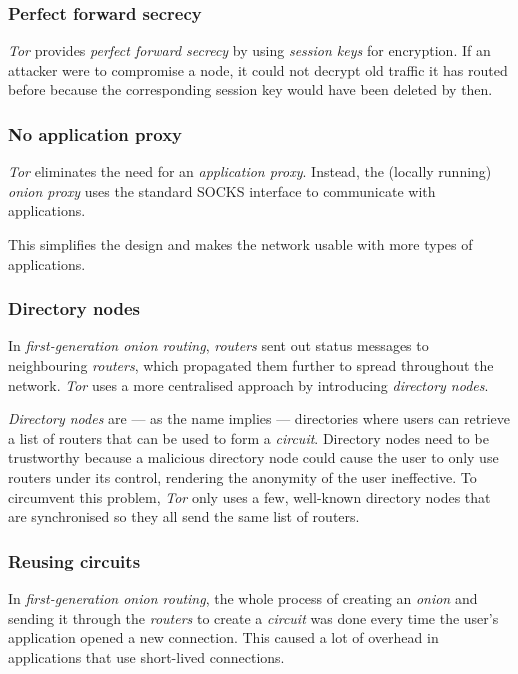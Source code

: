 \documentclass{sig-alternate}
\begin{document}
\subsubsection{Perfect forward secrecy}
\emph{Tor} provides \emph{perfect forward secrecy} by using \emph{session keys} for encryption.
If an attacker were to compromise a node, it could not decrypt old traffic it has routed before
because the corresponding session key would have been deleted by then.

\subsubsection{No application proxy}
\emph{Tor} eliminates the need for an \emph{application proxy}. Instead, the (locally running) 
\emph{onion proxy} uses the standard SOCKS interface to communicate with applications.

This simplifies the design and makes the network usable with more types of applications.

\subsubsection{Directory nodes}
In \emph{first-generation onion routing}, \emph{routers} sent out status messages to neighbouring
\emph{routers}, which propagated them further to spread throughout the network. \emph{Tor} uses
a more centralised approach by introducing \emph{directory nodes}.

\emph{Directory nodes} are --- as the name implies --- directories where users can retrieve a list of
routers that can be used to form a \emph{circuit}. Directory nodes need to be trustworthy because
a malicious directory node could cause the user to only use routers under its control, rendering
the anonymity of the user ineffective. To circumvent this problem, \emph{Tor} only uses a few,
well-known directory nodes that are synchronised so they all send the same list of routers. \cite{tor2004}

\subsubsection{Reusing circuits}
In \emph{first-generation onion routing}, the whole process of creating an \emph{onion} and sending
it through the \emph{routers} to create a \emph{circuit} was done every time the user's application
opened a new connection. This caused a lot of overhead in applications that use short-lived connections.
\end{document}
